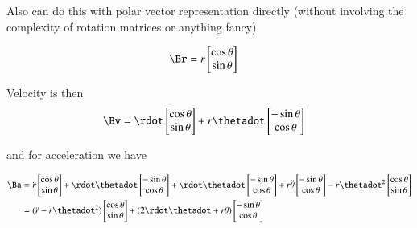 Also can do this with polar vector representation directly (without involving the complexity of rotation matrices or anything fancy)

\begin{align*}
\Br 
&= r 
\begin{bmatrix}
\cos\theta \\
\sin\theta
\end{bmatrix}
\end{align*}

Velocity is then
\begin{align*}
\Bv 
&= 
\rdot 
\begin{bmatrix}
\cos\theta \\
\sin\theta
\end{bmatrix}
+r \thetadot
\begin{bmatrix}
-\sin\theta \\
\cos\theta
\end{bmatrix}
\end{align*}

and for acceleration we have

\begin{align*}
\Ba 
&= 
\ddot{r}
\begin{bmatrix}
\cos\theta \\
\sin\theta
\end{bmatrix}
+\rdot \thetadot
\begin{bmatrix}
-\sin\theta \\
\cos\theta
\end{bmatrix}
+\rdot \thetadot
\begin{bmatrix}
-\sin\theta \\
\cos\theta
\end{bmatrix}
+r \ddot{\theta}
\begin{bmatrix}
-\sin\theta \\
\cos\theta
\end{bmatrix}
-r \thetadot^2
\begin{bmatrix}
\cos\theta \\
\sin\theta 
\end{bmatrix} \\
&=
(\ddot{r} -r \thetadot^2)
\begin{bmatrix}
\cos\theta \\
\sin\theta
\end{bmatrix}
+(2\rdot \thetadot +r \ddot{\theta})
\begin{bmatrix}
-\sin\theta \\
\cos\theta
\end{bmatrix}
\end{align*}
